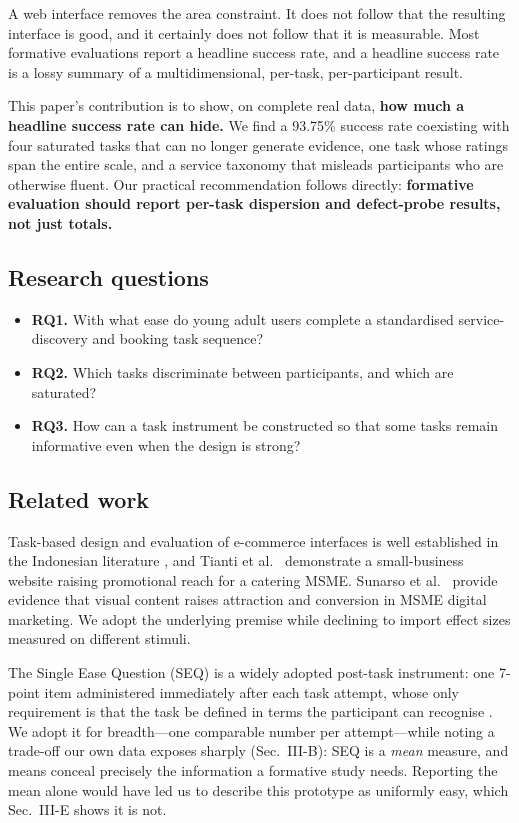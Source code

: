 \documentclass[conference]{IEEEtran}
\begin{document}
A web interface removes the area constraint. It does not follow that the
resulting interface is good, and it certainly does not follow that it is
measurable. Most formative evaluations report a headline success rate, and a
headline success rate is a lossy summary of a multidimensional, per-task,
per-participant result.

This paper's contribution is to show, on complete real data, \textbf{how much
a headline success rate can hide.} We find a 93.75\% success rate coexisting
with four saturated tasks that can no longer generate evidence, one task whose
ratings span the entire scale, and a service taxonomy that misleads
participants who are otherwise fluent. Our practical recommendation follows
directly: \textbf{formative evaluation should report per-task dispersion and
defect-probe results, not just totals.}

\subsection{Research questions}

\begin{itemize}
\item \textbf{RQ1.} With what ease do young adult users complete a standardised
service-discovery and booking task sequence?
\item \textbf{RQ2.} Which tasks discriminate between participants, and which
are saturated?
\item \textbf{RQ3.} How can a task instrument be constructed so that some
tasks remain informative even when the design is strong?
\end{itemize}

\subsection{Related work}

Task-based design and evaluation of e-commerce interfaces is well established
in the Indonesian literature \cite{dinata}, and Tianti et al.~\cite{tianti}
demonstrate a small-business website raising promotional reach for a catering
MSME. Sunarso et al.~\cite{sunarso} provide evidence that visual content
raises attraction and conversion in MSME digital marketing. We adopt the
underlying premise while declining to import effect sizes measured on
different stimuli.

The Single Ease Question (SEQ) is a widely adopted post-task instrument: one
7-point item administered immediately after each task attempt, whose only
requirement is that the task be defined in terms the participant can recognise
\cite{sauro}. We adopt it for breadth---one comparable number per
attempt---while noting a trade-off our own data exposes sharply
(Sec.~III-B): SEQ is a \emph{mean} measure, and means conceal precisely the
information a formative study needs. Reporting the mean alone would have led
us to describe this prototype as uniformly easy, which Sec.~III-E shows it is
not.
\end{document}
